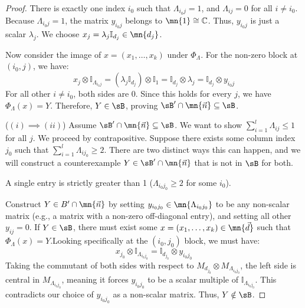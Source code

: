 \documentclass[12pt,a4paper]{amsart}
\theoremstyle{plain}
\theoremstyle{definition}
\theoremstyle{remark}
\numberwithin{equation}{section}
\theoremstyle{ser}
\theoremstyle{serr}
\theoremstyle{ser}
\theoremstyle{ser}
\theoremstyle{collabquestion}
\newcommand{\<}{\langle}
\renewcommand{\>}{\rangle}
\begin{document}
\begin{proof}
    There is exactly one index $i_0$ such that $\Lambda_{i_0 j} = 1$, and $\Lambda_{ij} = 0$ for all $i \neq i_0$.
    Because $\Lambda_{i_0 j} = 1$, the matrix $y_{i_0 j}$ belongs to $\mn{1} \cong \mathbb{C}$. Thus, $y_{i_0 j}$ is just a scalar $\lambda_j$.
    We choose $x_j = \lambda_j \mathbb{I}_{d_j} \in \mn{d_j}$.

    Now consider the image of $x = (x_1, \dots, x_k)$ under $\Phi_\Lambda$. For the non-zero block at $(i_0, j)$, we have:
    $$x_j \otimes \mathbb{I}_{\Lambda_{i_0 j}} = (\lambda_j \mathbb{I}_{d_j}) \otimes \mathbb{I}_1 = \mathbb{I}_{d_j} \otimes \lambda_j = \mathbb{I}_{d_j} \otimes y_{i_0 j}$$
    For all other $i \neq i_0$, both sides are $0$. Since this holds for every $j$, we have $\Phi_\Lambda(x) = Y$. Therefore, $Y \in \sB$, proving $\sB' \cap \mn{\vec{n}} \subseteq \sB$.

    \vspace{0.3cm}
    \noindent($(i) \implies (ii)$) Assume $\sB' \cap \mn{\vec{n}} \subseteq \sB$. We want to show $\sum_{i=1}^l \Lambda_{ij} \le 1$ for all $j$.
    We proceed by contrapositive. Suppose there exists some column index $j_0$ such that $\sum_{i=1}^l \Lambda_{i j_0} \ge 2$. There are two distinct ways this can happen, and we will construct a counterexample $Y \in \sB' \cap \mn{\vec{n}}$ that is not in $\sB$ for both.

     A single entry is strictly greater than 1 ($\Lambda_{i_0 j_0} \ge 2$ for some $i_0$).

    Construct $Y \in B' \cap \mn{\vec{n}}$ by setting $y_{i_0 j_0} \in \mn{\Lambda_{i_0 j_0}}$ to be any non-scalar matrix (e.g., a matrix with a non-zero off-diagonal entry), and setting all other $y_{ij} = 0$.
    If $Y \in \sB$, there must exist some $x = (x_1, \dots, x_k) \in \mn{\vec{d}}$ such that $\Phi_\Lambda(x) = Y$.Looking specifically at the $(i_0, j_0)$ block, we must have:$$x_{j_0} \otimes \mathbb{I}_{\Lambda_{i_0 j_0}} = \mathbb{I}_{d_{j_0}} \otimes y_{i_0 j_0}$$
    Taking the commutant of both sides with respect to $M_{d_{j_0}} \otimes M_{\Lambda_{i_0 j_0}}$, the left side is central in $M_{\Lambda_{i_0 j_0}}$, meaning it forces $y_{i_0 j_0}$ to be a scalar multiple of $\mathbb{I}_{\Lambda_{i_0 j_0}}$. This contradicts our choice of $y_{i_0 j_0}$ as a non-scalar matrix. Thus, $Y \notin \sB$.


\end{proof}
\end{document}
